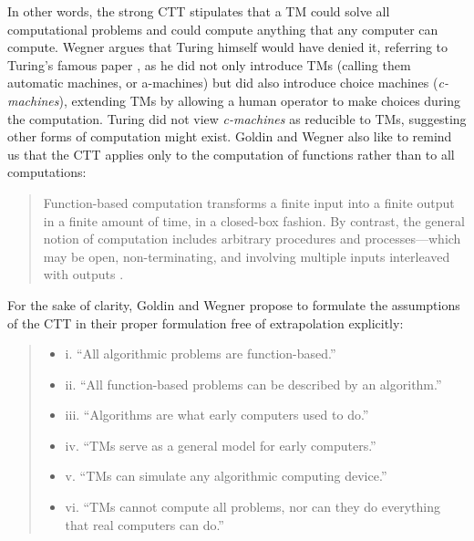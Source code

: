 \documentclass[a4paper, 11pt, twoside]{article}
\begin{document}
In other words, the strong CTT stipulates that a TM could solve all computational problems and could compute anything that any computer can compute. Wegner argues that Turing himself would have denied it, referring to Turing’s famous paper \parencite{Turing1937}, as he did not only introduce TMs (calling them automatic machines, or a-machines) but did also introduce choice machines (\textit{c-machines}), extending TMs by allowing a human operator to make choices during the computation. Turing did not view \textit{c-machines} as reducible to TMs, suggesting other forms of computation might exist. Goldin and Wegner also like to remind us that the CTT applies only to the computation of functions rather than to all computations: 

\begin{quote}
Function-based computation transforms a finite input into a finite output in a finite amount of time, in a closed-box fashion. By contrast, the general notion of computation includes arbitrary procedures and processes---which may be open, non-terminating, and involving multiple inputs interleaved with outputs \parencite{Goldin2008}. 
\end{quote}

For the sake of clarity, Goldin and Wegner propose to formulate the assumptions of the CTT in their proper formulation free of extrapolation \parencite{Goldin2008} explicitly: 

\begin{quote}
 \begin{itemize}
\item  i. ``All algorithmic problems are function-based.''
\item  ii. ``All function-based problems can be described by an algorithm.''
\item  iii. ``Algorithms are what early computers used to do.''
\item  iv. ``TMs serve as a general model for early computers.''
\item  v. ``TMs can simulate any algorithmic computing device.''
\item  vi. ``TMs cannot compute all problems, nor can they do everything that real computers can do.''

 \end{itemize}
\end{quote}
\end{document}
